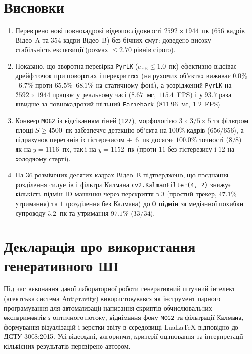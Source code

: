 \documentclass[14pt, a4paper]{extarticle}
\begin{document}
\section{Висновки}
\begin{enumerate}
    \item Перевірено нові повнокадрові відеопослідовності $2592 \times 1944$~пк ($656$ кадрів Відео~A та $354$ кадри Відео~B) без бічних смуг: доведено високу стабільність експозиції (розмах $\le 2.70$ рівнів сірого).
    \item Показано, що зворотна перевірка \texttt{PyrLK} ($e_{\text{FB}} \le 1.0$~пк) ефективно відсіває дрейф точок при поворотах і перекриттях (на рухомих об'єктах виживає $0.0\%$--$6.7\%$ проти $65.5\%$--$68.1\%$ на статичному фоні), а розріджений \texttt{PyrLK} на $2592 \times 1944$ працює у реальному часі ($8.67$~мс, $115.4$~FPS) і у $\mathbf{93.7}$ раза швидше за повнокадровий щільний \texttt{Farneback} ($811.96$~мс, $1.2$~FPS).
    \item Конвеєр \texttt{MOG2} із відсіканням тіней (\texttt{127}), морфологією $3{\times}3 / 5{\times}5$ та фільтром площі $S \ge 4500$~пк забезпечує детекцію об'єкта на $100\%$ кадрів ($656/656$), а підрахунок перетинів із гістерезисом $\pm 16$~пк досягає $100.0\%$ точності ($8/8$) як на $y = 1116$~пк, так і на $y = 1152$~пк (проти $11$ без гістерезису і $12$ на холодному старті).
    \item На $36$ розмічених десятих кадрах Відео~B підтверджено, що поєднання розділення силуетів і фільтра Калмана \texttt{cv2.KalmanFilter(4, 2)} знижує кількість підмін ID машинки через перекриття з $3$ (простий трекер, $47.1\%$ утримання) та $1$ (розділення без Калмана) до \textbf{$\mathbf{0}$ підмін} за медіанної похибки супроводу $3.2$~пк та утримання $97.1\%$ ($33/34$).
\end{enumerate}

\section{Декларація про використання генеративного ШІ}
Під час виконання даної лабораторної роботи генеративний штучний інтелект (агентська система Antigravity) використовувався як інструмент парного програмування для автоматизації написання скриптів обчислювальних експериментів з оптичного потоку, віднімання фону \texttt{MOG2} та фільтрації Калмана, формування візуалізацій і верстки звіту в середовищі LuaLaTeX відповідно до ДСТУ 3008:2015. Усі відеодані, алгоритми, критерії оцінювання та інтерпретації кількісних результатів перевірено автором.
\end{document}
